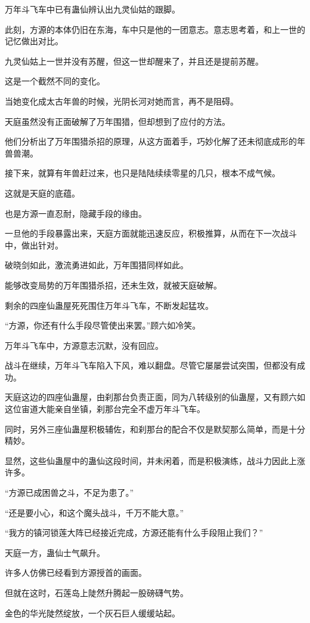 \begin{this_body}
万年斗飞车中已有蛊仙辨认出九灵仙姑的跟脚。

此刻，方源的本体仍旧在东海，车中只是他的一团意志。意志思考着，和上一世的记忆做出对比。

九灵仙姑上一世并没有苏醒，但这一世却醒来了，并且还是提前苏醒。

这是一个截然不同的变化。

当她变化成太古年兽的时候，光阴长河对她而言，再不是阻碍。

天庭虽然没有正面破解了万年围猎，但却想到了应付的方法。

他们分析出了万年围猎杀招的原理，从这方面着手，巧妙化解了还未彻底成形的年兽兽潮。

接下来，就算有年兽赶过来，也只是陆陆续续零星的几只，根本不成气候。

这就是天庭的底蕴。

也是方源一直忍耐，隐藏手段的缘由。

一旦他的手段暴露出来，天庭方面就能迅速反应，积极推算，从而在下一次战斗中，做出针对。

破晓剑如此，激流勇进如此，万年围猎同样如此。

能够改变局势的万年围猎杀招，还未生效，就被天庭破解。

剩余的四座仙蛊屋死死围住万年斗飞车，不断发起猛攻。

“方源，你还有什么手段尽管使出来罢。”顾六如冷笑。

万年斗飞车中，方源意志沉默，没有回应。

战斗在继续，万年斗飞车陷入下风，难以翻盘。尽管它屡屡尝试突围，但都没有成功。

天庭这边的四座仙蛊屋，由刹那台负责正面，同为八转级别的仙蛊屋，又有顾六如这位宙道大能亲自坐镇，刹那台完全不虚万年斗飞车。

同时，另外三座仙蛊屋积极辅佐，和刹那台的配合不仅是默契那么简单，而是十分精妙。

显然，这些仙蛊屋中的蛊仙这段时间，并未闲着，而是积极演练，战斗力因此上涨许多。

“方源已成困兽之斗，不足为患了。”

“还是要小心，和这个魔头战斗，千万不能大意。”

“我方的镇河锁莲大阵已经接近完成，方源还能有什么手段阻止我们？”

天庭一方，蛊仙士气飙升。

许多人仿佛已经看到方源授首的画面。

但就在这时，石莲岛上陡然升腾起一股磅礴气势。

金色的华光陡然绽放，一个灰石巨人缓缓站起。


\end{this_body}
